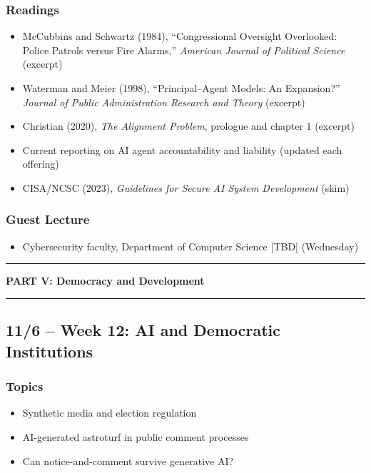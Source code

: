 \documentclass[12pt]{article}
\begin{document}
    \subsubsection*{Readings}
        \begin{itemize}
            \item McCubbins and Schwartz (1984), ``Congressional Oversight Overlooked: Police Patrols versus Fire Alarms,'' \emph{American Journal of Political Science} (excerpt)
            \item Waterman and Meier (1998), ``Principal--Agent Models: An Expansion?'' \emph{Journal of Public Administration Research and Theory} (excerpt)
            \item Christian (2020), \emph{The Alignment Problem}, prologue and chapter 1 (excerpt)
            \item Current reporting on AI agent accountability and liability (updated each offering)
            \item CISA/NCSC (2023), \emph{Guidelines for Secure AI System Development} (skim)
        \end{itemize}
    \subsubsection*{Guest Lecture}
        \begin{itemize}
            \item Cybersecurity faculty, Department of Computer Science [TBD] (Wednesday)
        \end{itemize}

\bigskip
\noindent\rule{\textwidth}{0.6pt}
\begin{center}\textbf{PART V: Democracy and Development}\end{center}
\noindent\rule{\textwidth}{0.6pt}

\subsection*{11/6 -- Week 12: AI and Democratic Institutions}
    \subsubsection*{Topics}
        \begin{itemize}
            \item Synthetic media and election regulation
            \item AI-generated astroturf in public comment processes
            \item Can notice-and-comment survive generative AI?
        \end{itemize}
\end{document}
